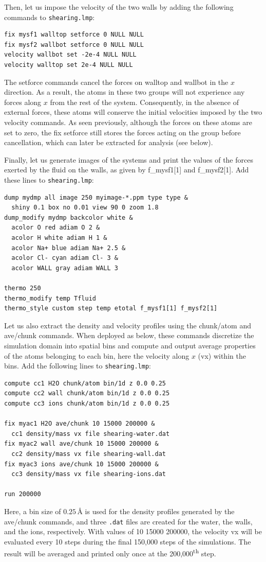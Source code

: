 \documentclass[9pt,tutorial]{livecoms}
\newcommand{\lmpcmd}[1]{\colorbox{listing}{\textcolor{command}{\small{#1}}}} %
\newcommand{\flecmd}[1]{\textcolor{command}{\texttt{#1}}} %
\begin{document}
Then, let us impose the velocity of the two walls by adding the following
commands to \flecmd{shearing.lmp}:
\begin{lstlisting}
fix mysf1 walltop setforce 0 NULL NULL
fix mysf2 wallbot setforce 0 NULL NULL
velocity wallbot set -2e-4 NULL NULL
velocity walltop set 2e-4 NULL NULL
\end{lstlisting}
The \lmpcmd{setforce} commands cancel the forces on \lmpcmd{walltop} and
\lmpcmd{wallbot} {\color{blue}in the $x$ direction}.  As a result, the atoms in these two groups will not
experience any forces {\color{blue}along $x$} from the rest of the system.  Consequently, in the absence of
external forces, these atoms will conserve the initial velocities imposed by the
two \lmpcmd{velocity} commands.  {\color{blue}As seen previously, although the
forces on these atoms are set to zero, the \lmpcmd{fix setforce} still stores the
forces acting on the group before cancellation, which can later be extracted
for analysis (see below).}

Finally, let us generate images of the systems and print the values of the
forces exerted by the fluid on the walls, as given by \lmpcmd{f\_mysf1[1]}
and \lmpcmd{f\_mysf2[1]}.  Add these lines to \flecmd{shearing.lmp}:
\begin{lstlisting}
dump mydmp all image 250 myimage-*.ppm type type &
  shiny 0.1 box no 0.01 view 90 0 zoom 1.8
dump_modify mydmp backcolor white &
  acolor O red adiam O 2 &
  acolor H white adiam H 1 &
  acolor Na+ blue adiam Na+ 2.5 &
  acolor Cl- cyan adiam Cl- 3 &
  acolor WALL gray adiam WALL 3

thermo 250
thermo_modify temp Tfluid
thermo_style custom step temp etotal f_mysf1[1] f_mysf2[1]
\end{lstlisting}
Let us also extract the density and velocity profiles using
the \lmpcmd{chunk/atom} and \lmpcmd{ave/chunk} commands.  {\color{blue}When deployed as below, these
commands discretize the simulation domain into spatial bins and compute and output
average properties of the atoms belonging to each bin, here the velocity
along $x$ (\lmpcmd{vx}) within the bins.}  Add the following lines to \flecmd{shearing.lmp}:
\begin{lstlisting}
compute cc1 H2O chunk/atom bin/1d z 0.0 0.25
compute cc2 wall chunk/atom bin/1d z 0.0 0.25
compute cc3 ions chunk/atom bin/1d z 0.0 0.25

fix myac1 H2O ave/chunk 10 15000 200000 &
  cc1 density/mass vx file shearing-water.dat
fix myac2 wall ave/chunk 10 15000 200000 &
  cc2 density/mass vx file shearing-wall.dat
fix myac3 ions ave/chunk 10 15000 200000 &
  cc3 density/mass vx file shearing-ions.dat

run 200000
\end{lstlisting}
Here, a bin size of $0.25\,\text{\AA{}}$ is used for the density
profiles generated by the \lmpcmd{ave/chunk} commands, and three
\flecmd{.dat} files are created for the water, the walls, and the ions,
respectively.  With values of \lmpcmd{10 15000 200000}, the velocity
\lmpcmd{vx} will be evaluated every 10 steps during the final 150,000
steps of the simulations.  The result will be averaged and printed only
once at the 200,000\textsuperscript{th} step.
\end{document}
